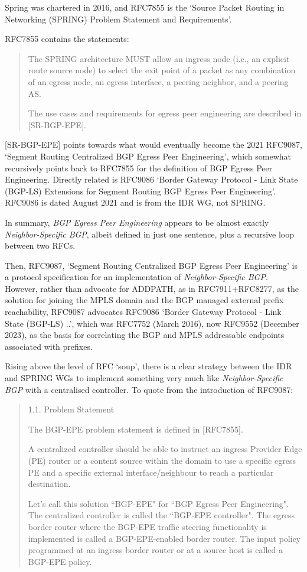 Spring was chartered in 2016, and RFC7855 is the `Source Packet Routing in Networking (SPRING) Problem Statement and Requirements'.

RFC7855 contains the statements:
\begin{quote}
       The SPRING architecture MUST allow an ingress node (i.e., an explicit
   route source node) to select the exit point of a packet as any
   combination of an egress node, an egress interface, a peering
   neighbor, and a peering AS.

   The use cases and requirements for egress peer engineering are
   described in [SR-BGP-EPE].
\end{quote}
[SR-BGP-EPE] points towards what would eventually become the 2021 RFC9087, `Segment Routing Centralized BGP Egress Peer Engineering'\cite{rfc9087}, which somewhat recursively points back to RFC7855 for the definition of BGP Egress Peer Engineering.  Directly related is RFC9086 `Border Gateway Protocol - Link State (BGP-LS) Extensions for Segment Routing BGP Egress Peer Engineering'.  RFC9086 is dated August 2021 and is from the IDR WG, not SPRING.

In summary, \emph{BGP Egress Peer Engineering} appears to be almost exactly \emph{Neighbor-Speciﬁc BGP}, albeit defined in just one sentence, plus a recursive loop between two RFCs. 

Then, RFC9087, `Segment Routing Centralized BGP Egress Peer Engineering'\cite{rfc9087}  is a protocol specification for an implementation of \emph{Neighbor-Speciﬁc BGP}.  However, rather than advocate for ADDPATH, as in RFC7911+RFC8277, as the solution for joining the MPLS domain and the BGP managed external prefix reachability, RFC9087 advocates RFC9086 `Border Gateway Protocol - Link State (BGP-LS) ..', which was RFC7752 (March 2016), now RFC9552 (December 2023), as the basis for correlating the BGP and MPLS addressable endpoints associated with prefixes.

Rising above the level of RFC `soup', there is a clear strategy between the IDR and SPRING WGs to implement something very much like \emph{Neighbor-Speciﬁc BGP} with a centralised controller. To quote from the introduction of RFC9087:
\begin{quote}
    1.1.  Problem Statement

   The BGP-EPE problem statement is defined in [RFC7855].

   A centralized controller should be able to instruct an ingress
   Provider Edge (PE) router or a content source within the domain to
   use a specific egress PE and a specific external interface/neighbour
   to reach a particular destination.

   Let's call this solution ``BGP-EPE" for ``BGP Egress Peer Engineering".
   The centralized controller is called the ``BGP-EPE controller".  The
   egress border router where the BGP-EPE traffic steering functionality
   is implemented is called a BGP-EPE-enabled border router.  The input
   policy programmed at an ingress border router or at a source host is
   called a BGP-EPE policy.
\end{quote}

